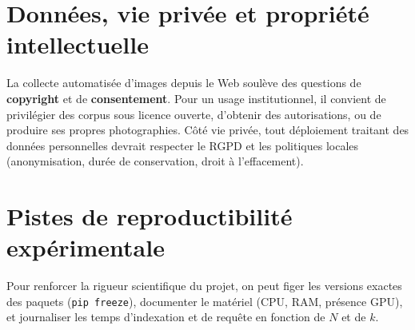 \documentclass[11pt,a4paper,openany]{report}
\begin{document}
\section{Données, vie privée et propriété intellectuelle}

La collecte automatisée d'images depuis le Web soulève des questions de \textbf{copyright} et de \textbf{consentement}. Pour un usage institutionnel, il convient de privilégier des corpus sous licence ouverte, d'obtenir des autorisations, ou de produire ses propres photographies. Côté vie privée, tout déploiement traitant des données personnelles devrait respecter le RGPD et les politiques locales (anonymisation, durée de conservation, droit à l'effacement).

\section{Pistes de reproductibilité expérimentale}

Pour renforcer la rigueur scientifique du projet, on peut figer les versions exactes des paquets (\texttt{pip freeze}), documenter le matériel (CPU, RAM, présence GPU), et journaliser les temps d'indexation et de requête en fonction de $N$ et de $k$.

\cleardoublepage
{}
\end{document}
